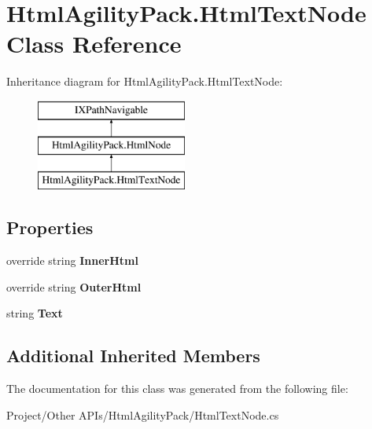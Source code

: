 \hypertarget{class_html_agility_pack_1_1_html_text_node}{}\section{Html\+Agility\+Pack.\+Html\+Text\+Node Class Reference}
\label{class_html_agility_pack_1_1_html_text_node}
Inheritance diagram for Html\+Agility\+Pack.\+Html\+Text\+Node\+:\begin{figure}[H]
\begin{center}
\leavevmode
\includegraphics[height=3.000000cm]{class_html_agility_pack_1_1_html_text_node}
\end{center}
\end{figure}
\subsection*{Properties}
\begin{DoxyCompactItemize}
\item 
\mbox{\label{class_html_agility_pack_1_1_html_text_node_a4b997c12c07eef9965d6a6541bfa3fee}} 
override string {\bfseries Inner\+Html}
\item 
\mbox{\label{class_html_agility_pack_1_1_html_text_node_a3f28a4635a2a285295c122290dac906c}} 
override string {\bfseries Outer\+Html}
\item 
\mbox{\label{class_html_agility_pack_1_1_html_text_node_ae5d4da856a540bd9b275e5ae9aa38e28}} 
string {\bfseries Text}
\end{DoxyCompactItemize}
\subsection*{Additional Inherited Members}


The documentation for this class was generated from the following file\+:\begin{DoxyCompactItemize}
\item 
Project/\+Other A\+P\+Is/\+Html\+Agility\+Pack/Html\+Text\+Node.\+cs\end{DoxyCompactItemize}
